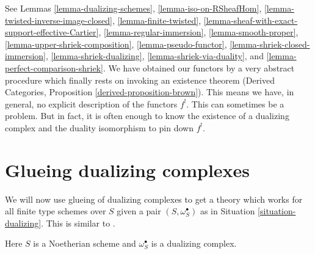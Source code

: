 See Lemmas
\ref{lemma-dualizing-schemes},
\ref{lemma-iso-on-RSheafHom},
\ref{lemma-twisted-inverse-image-closed},
\ref{lemma-finite-twisted},
\ref{lemma-sheaf-with-exact-support-effective-Cartier},
\ref{lemma-regular-immersion},
\ref{lemma-smooth-proper},
\ref{lemma-upper-shriek-composition},
\ref{lemma-pseudo-functor},
\ref{lemma-shriek-closed-immersion},
\ref{lemma-shriek-dualizing},
\ref{lemma-shriek-via-duality}, and
\ref{lemma-perfect-comparison-shriek}.
We have obtained our functors by a very abstract procedure
which finally rests on invoking an existence theorem
(Derived Categories, Proposition \ref{derived-proposition-brown}).
This means we have, in general, no explicit description of the functors $f^!$.
This can sometimes be a problem. But in fact, it is often enough to know
the existence of a dualizing complex and the duality isomorphism
to pin down $f^!$.






\section{Glueing dualizing complexes}
\label{section-glue}

\noindent
We will now use glueing of dualizing complexes to get a theory which works for
all finite type schemes over $S$ given a pair $(S, \omega_S^\bullet)$
as in Situation \ref{situation-dualizing}. This is similar to
\cite[Remark on page 310]{RD}.

\begin{situation}
\label{situation-dualizing}
Here $S$ is a Noetherian scheme and $\omega_S^\bullet$ is a dualizing
complex.
\end{situation}

